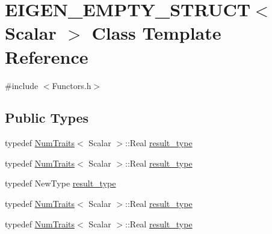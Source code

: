 \hypertarget{struct_e_i_g_e_n___e_m_p_t_y___s_t_r_u_c_t}{\section{E\-I\-G\-E\-N\-\_\-\-E\-M\-P\-T\-Y\-\_\-\-S\-T\-R\-U\-C\-T$<$ Scalar $>$ Class Template Reference}
\label{struct_e_i_g_e_n___e_m_p_t_y___s_t_r_u_c_t}
}


{\ttfamily \#include $<$Functors.\-h$>$}

\subsection*{Public Types}
\begin{DoxyCompactItemize}
\item 
typedef \hyperlink{struct_num_traits}{Num\-Traits}$<$ Scalar $>$\-::Real \hyperlink{struct_e_i_g_e_n___e_m_p_t_y___s_t_r_u_c_t_a99f2ce1c1dfd4e7ff53eadc336c7816e}{result\-\_\-type}
\item 
typedef \hyperlink{struct_num_traits}{Num\-Traits}$<$ Scalar $>$\-::Real \hyperlink{struct_e_i_g_e_n___e_m_p_t_y___s_t_r_u_c_t_a99f2ce1c1dfd4e7ff53eadc336c7816e}{result\-\_\-type}
\item 
typedef New\-Type \hyperlink{struct_e_i_g_e_n___e_m_p_t_y___s_t_r_u_c_t_a3373b29b073fe71df1840caf9cb13b2d}{result\-\_\-type}
\item 
typedef \hyperlink{struct_num_traits}{Num\-Traits}$<$ Scalar $>$\-::Real \hyperlink{struct_e_i_g_e_n___e_m_p_t_y___s_t_r_u_c_t_a99f2ce1c1dfd4e7ff53eadc336c7816e}{result\-\_\-type}
\item 
typedef \hyperlink{struct_num_traits}{Num\-Traits}$<$ Scalar $>$\-::Real \hyperlink{struct_e_i_g_e_n___e_m_p_t_y___s_t_r_u_c_t_a99f2ce1c1dfd4e7ff53eadc336c7816e}{result\-\_\-type}
\end{DoxyCompactItemize}
